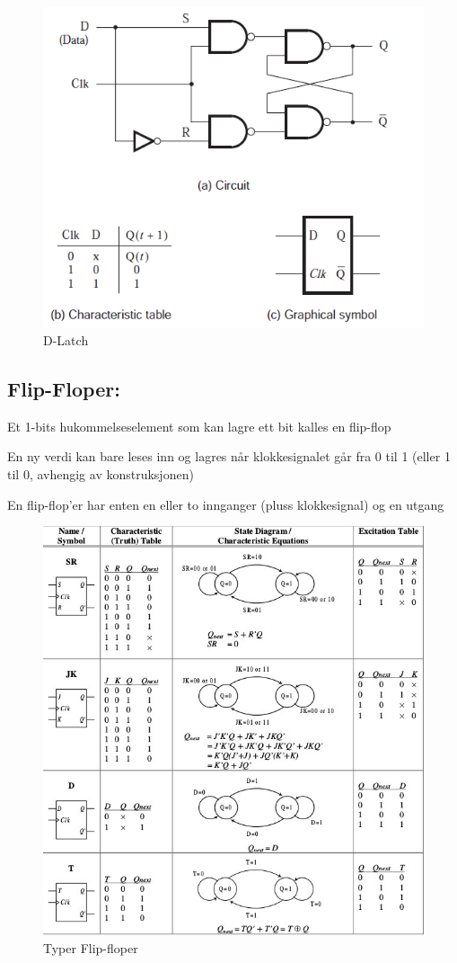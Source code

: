 \documentclass{article}
\begin{document}
	\begin{figure}[H]
		\includegraphics[scale = 0.6]{dL.png}
		\caption{D-Latch}
	\end{figure}
	
	
	\subsection*{Flip-Floper:}
	Et 1-bits hukommelseselement som kan	lagre ett bit kalles en flip-flop
	
	En ny verdi kan	bare leses inn og lagres når klokkesignalet går fra 0 til 1 (eller 1 til 0, avhengig av konstruksjonen)
	
	En flip-flop’er har	enten en eller to innganger (pluss klokkesignal) og en utgang
	
	\begin{figure}[H]
		\includegraphics[scale = 0.6]{flip-flop.jpg}
		\caption{Typer Flip-floper}
	\end{figure}
	
\end{document}
